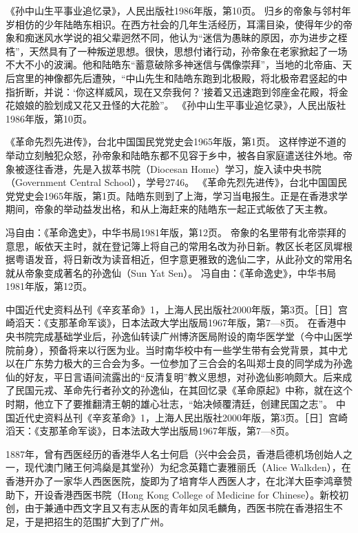 \documentclass[12pt,UTF8]{ctexbook}
\begin{document}
《孙中山生平事业追忆录》，人民出版社1986年版，第10页。
归乡的帝象与邻村年岁相仿的少年陆皓东相识。在西方社会的几年生活经历，耳濡目染，使得年少的帝象和痴迷风水学说的祖父辈迥然不同，他认为“迷信为愚昧的原因，亦为进步之桎梏”，天然具有了一种叛逆思想。很快，思想付诸行动，孙帝象在老家掀起了一场不大不小的波澜。他和陆皓东“蓄意破除多神迷信与偶像崇拜”，当地的北帝庙、天后宫里的神像都先后遭殃，“中山先生和陆皓东跑到北极殿，将北极帝君竖起的中指折断，并说：‘你这样威风，现在又奈我何？’接着又迅速跑到邻座金花殿，将金花娘娘的脸划成又花又丑怪的大花脸”。 《孙中山生平事业追忆录》，人民出版社1986年版，第10页。

《革命先烈先进传》，台北中国国民党党史会1965年版，第1页。
这样悖逆不道的举动立刻触犯众怒，孙帝象和陆皓东都不见容于乡中，被各自家庭遣送往外地。帝象被逐往香港，先是入拔萃书院（Diocesan Home）学习，旋入读中央书院（Government Central School），学号2746。 《革命先烈先进传》，台北中国国民党党史会1965年版，第1页。陆皓东则到了上海，学习当电报生。正是在香港求学期间，帝象的举动益发出格，和从上海赶来的陆皓东一起正式皈依了天主教。

冯自由：《革命逸史》，中华书局1981年版，第12页。
帝象的名里带有北帝崇拜的意思，皈依天主时，就在登记簿上将自己的常用名改为孙日新。教区长老区凤墀根据粤语发音，将日新改为读音相近，但字意更雅致的逸仙二字，从此孙文的常用名就从帝象变成著名的孙逸仙（Sun Yat Sen）。 冯自由：《革命逸史》，中华书局1981年版，第12页。

中国近代史资料丛刊《辛亥革命》1，上海人民出版社2000年版，第3页。［日］宫崎滔天：《支那革命军谈》，日本法政大学出版局1967年版，第7—8页。
在香港中央书院完成基础学业后，孙逸仙转读广州博济医局附设的南华医学堂（今中山医学院前身），预备将来以行医为业。当时南华校中有一些学生带有会党背景，其中尤以在广东势力极大的三合会为多。一位参加了三合会的名叫郑士良的同学成为孙逸仙的好友，平日言语间流露出的“反清复明”教义思想，对孙逸仙影响颇大。后来成了民国元戎、革命先行者孙文的孙逸仙，在其回忆录《革命原起》中称，就在这个时期，他立下了要推翻清王朝的雄心壮志，“始决倾覆清廷，创建民国之志”。 中国近代史资料丛刊《辛亥革命》1，上海人民出版社2000年版，第3页。［日］宫崎滔天：《支那革命军谈》，日本法政大学出版局1967年版，第7—8页。

1887年，曾有西医经历的香港华人名士何启（兴中会会员，香港启德机场创始人之一，现代澳门赌王何鸿燊是其堂孙）为纪念英籍亡妻雅丽氏（Alice Walkden），在香港开办了一家华人西医医院，旋即为了培育华人西医人才，在北洋大臣李鸿章赞助下，开设香港西医书院（Hong Kong College of Medicine for Chinese）。新校初创，由于兼通中西文字且又有志从医的青年如凤毛麟角，西医书院在香港招生不足，于是把招生的范围扩大到了广州。
\end{document}
